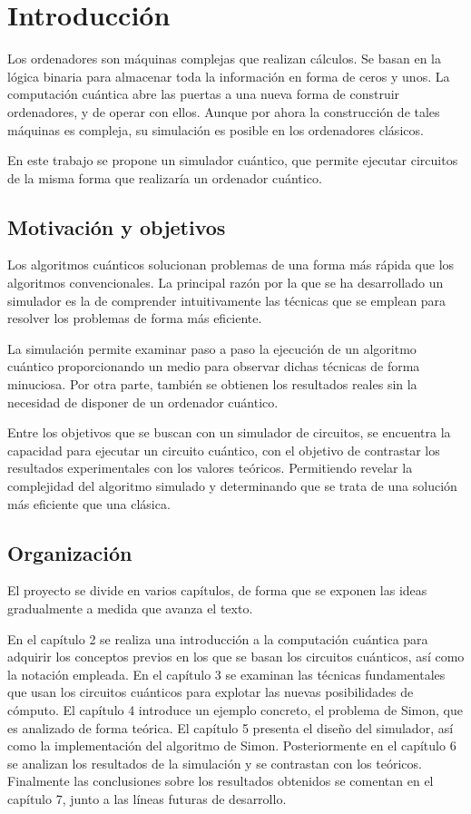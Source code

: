 \chapter{Introducción}

Los ordenadores son máquinas complejas que realizan cálculos. Se basan en la 
lógica binaria para almacenar toda la información en forma de ceros y unos.
%
La computación cuántica abre las puertas a una nueva forma de construir 
ordenadores, y de operar con ellos. Aunque por ahora la construcción de tales 
máquinas es compleja, su simulación es posible en los ordenadores clásicos.

En este trabajo se propone un simulador cuántico, que permite ejecutar circuitos 
de la misma forma que realizaría un ordenador cuántico.

\section{Motivación y objetivos}

Los algoritmos cuánticos solucionan problemas de una forma más rápida que los 
algoritmos convencionales. La principal razón por la que se ha desarrollado un 
simulador es la de comprender intuitivamente las técnicas que se emplean para 
resolver los problemas de forma más eficiente.

La simulación permite examinar paso a paso la ejecución de un algoritmo cuántico 
proporcionando un medio para observar dichas técnicas de forma minuciosa. Por 
otra parte, también se obtienen los resultados reales sin la necesidad de 
disponer de un ordenador cuántico.

Entre los objetivos que se buscan con un simulador de circuitos, se encuentra la 
capacidad para ejecutar un circuito cuántico, con el objetivo de contrastar los 
resultados experimentales con los valores teóricos. Permitiendo revelar la 
complejidad del algoritmo simulado y determinando que se trata de una solución 
más eficiente que una clásica.

%

\section{Organización}
El proyecto se divide en varios capítulos, de forma que se exponen las ideas 
gradualmente a medida que avanza el texto.

En el capítulo 2 se realiza una introducción a la computación cuántica para 
adquirir los conceptos previos en los que se basan los circuitos cuánticos, así 
como la notación empleada. En el capítulo 3 se examinan las técnicas 
fundamentales que usan los circuitos cuánticos para explotar las nuevas 
posibilidades de cómputo. El capítulo 4 introduce un ejemplo concreto, el 
problema de Simon, que es analizado de forma teórica. El capítulo 5 presenta el 
diseño del simulador, así como la implementación del algoritmo de Simon.  
Posteriormente en el capítulo 6 se analizan los resultados de la simulación y se 
contrastan con los teóricos. Finalmente las conclusiones sobre los resultados 
obtenidos se comentan en el capítulo 7, junto a las líneas futuras de 
desarrollo.

